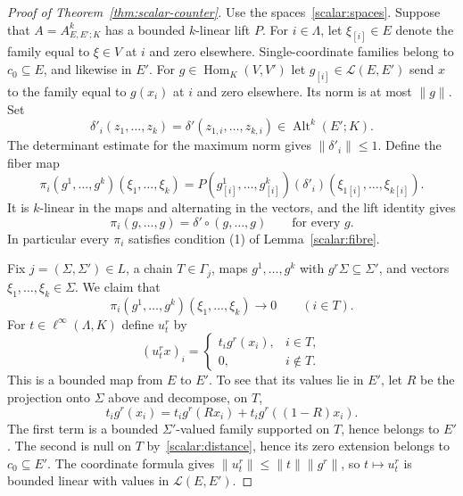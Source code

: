 \documentclass[11pt]{amsart}
\theoremstyle{definition}
\theoremstyle{remark}
\numberwithin{equation}{section}
\newcommand{\cL}{\mathcal L}
\newcommand{\Alt}{\operatorname{Alt}}
\newcommand{\linf}{\ell^\infty}
\newcommand{\norm}[1]{\lVert #1\rVert}
\theoremstyle{plain}
\theoremstyle{definition}
\theoremstyle{plain}
\begin{document}
\begin{proof}[Proof of Theorem~\ref{thm:scalar-counter}]
Use the spaces~\eqref{scalar:spaces}. Suppose that $A=A^k_{E,E';K}$ has a bounded $k$\nobreakdash-linear
lift $P$. For $i\in\Lambda$, let $\xi_{[i]}\in E$ denote the family equal to $\xi\in V$ at $i$ and zero
elsewhere. Single-coordinate families belong to $c_0\subseteq E$, and likewise in $E'$. For
$g\in\operatorname{Hom}_K(V,V')$ let $g_{[i]}\in\cL(E,E')$ send $x$ to the family equal to $g(x_i)$ at
$i$ and zero elsewhere. Its norm is at most $\norm g$. Set
\[
 \delta'_i(z_1,\dots,z_k)=\delta'(z_{1,i},\dots,z_{k,i})\in\Alt^k(E';K).
\]
The determinant estimate for the maximum norm gives $\norm{\delta'_i}\le1$. Define the fiber map
\begin{equation}\label{scalar:fibre-map}
 \pi_i(g^1,\dots,g^k)(\xi_1,\dots,\xi_k)
 =P(g^1_{[i]},\dots,g^k_{[i]})(\delta'_i)
       (\xi_{1[i]},\dots,\xi_{k[i]}).
\end{equation}
It is $k$\nobreakdash-linear in the maps and alternating in the vectors, and the lift identity gives
\begin{equation}\label{scalar:fibre-diagonal}
 \pi_i(g,\dots,g)=\delta'\circ(g,\dots,g)
 \qquad\text{for every }g.
\end{equation}
In particular every $\pi_i$ satisfies condition (1) of Lemma~\ref{scalar:fibre}.

Fix $j=(\Sigma,\Sigma')\in L$, a chain $T\in\Gamma_j$, maps $g^1,\dots,g^k$ with
$g^r\Sigma\subseteq\Sigma'$, and vectors $\xi_1,\dots,\xi_k\in\Sigma$. We claim that
\begin{equation}\label{scalar:chain-decay}
 \pi_i(g^1,\dots,g^k)(\xi_1,\dots,\xi_k)\longrightarrow0
 \qquad(i\in T).
\end{equation}
For $t\in\linf(\Lambda,K)$ define $u^r_t$ by
\[
 (u^r_t x)_i=\begin{cases}t_i g^r(x_i),&i\in T,\\0,&i\notin T.\end{cases}
\]
This is a bounded map from $E$ to $E'$. To see that its values lie in $E'$, let $R$ be the projection
onto $\Sigma$ above and decompose, on $T$,
\[
 t_i g^r(x_i)=t_i g^r(Rx_i)+t_i g^r((1-R)x_i).
\]
The first term is a bounded $\Sigma'$\nobreakdash-valued family supported on $T$, hence belongs to $E'$.
The second is null on $T$ by~\eqref{scalar:distance}, hence its zero extension belongs to $c_0\subseteq E'$.
The coordinate formula gives $\norm{u^r_t}\le\norm t\norm{g^r}$, so $t\mapsto u^r_t$ is bounded linear
with values in $\cL(E,E')$.


\end{proof}
\end{document}
